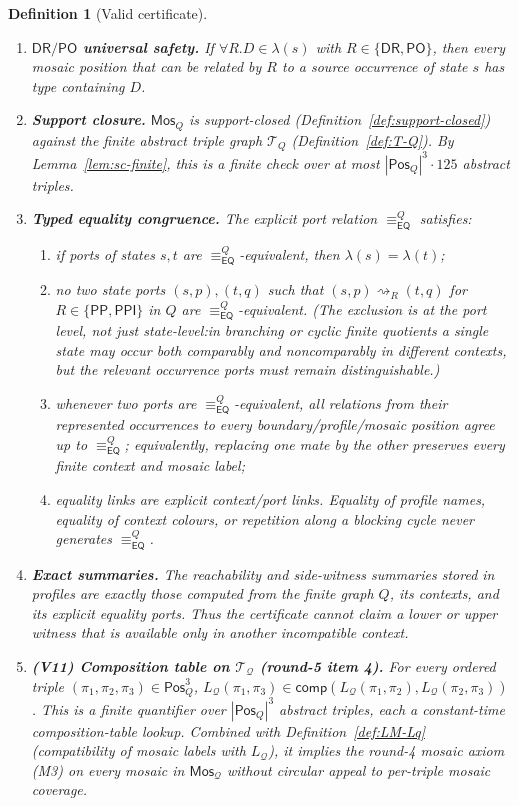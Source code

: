 \documentclass[11pt]{article}
\newtheorem{definition}[theorem]{Definition}
\newcommand{\EQ}{\mathsf{EQ}}
\newcommand{\DR}{\mathsf{DR}}
\newcommand{\PO}{\mathsf{PO}}
\newcommand{\PP}{\mathsf{PP}}
\newcommand{\PPI}{\mathsf{PPI}}
\newcommand{\comp}{\mathsf{comp}}
\newcommand{\Q}{\mathcal Q}
\newcommand{\Mos}{\mathsf{Mos}}
\newcommand{\reach}{\rightsquigarrow}
\newcommand{\eqc}{\equiv_{\EQ}}
\newcommand{\Pos}{\mathsf{Pos}}
\newcommand{\T}{\mathcal T}
\begin{document}
\begin{definition}[Valid certificate]
\begin{enumerate}[label=(V\arabic*)]
\item \textbf{$\DR/\PO$ universal safety.}  If $\forall R.D\in\lambda(s)$ with $R\in\{\DR,\PO\}$, then every mosaic position that can be related by $R$ to a source occurrence of state $s$ has type containing $D$.

\item \textbf{Support closure.}  $\Mos_Q$ is support-closed (Definition~\ref{def:support-closed}) against the finite abstract triple graph $\mathcal T_Q$ (Definition~\ref{def:T-Q}).  By Lemma~\ref{lem:sc-finite}, this is a finite check over at most $|\Pos_Q|^3\cdot 125$ abstract triples.

\item \textbf{Typed equality congruence.}  The explicit port relation $\eqc^{Q}$ satisfies:
  \begin{enumerate}[label=(E\alph*)]
  \item if ports of states $s,t$ are $\eqc^{Q}$-equivalent, then $\lambda(s)=\lambda(t)$;
  \item no two state ports $(s,p),(t,q)$ such that $(s,p)\reach_R(t,q)$ for $R\in\{\PP,\PPI\}$ in $Q$ are $\eqc^{Q}$-equivalent.  (The exclusion is at the port level, not just state-level:\@ in branching or cyclic finite quotients a single state may occur both comparably and noncomparably in different contexts, but the relevant occurrence ports must remain distinguishable.)
  \item whenever two ports are $\eqc^{Q}$-equivalent, all relations from their represented occurrences to every boundary/profile/mosaic position agree up to $\eqc^{Q}$; equivalently, replacing one mate by the other preserves every finite context and mosaic label;
  \item equality links are explicit context/port links.  Equality of profile names, equality of context colours, or repetition along a blocking cycle never generates $\eqc^{Q}$.
  \end{enumerate}

\item \textbf{Exact summaries.}  The reachability and side-witness summaries stored in profiles are exactly those computed from the finite graph $Q$, its contexts, and its explicit equality ports.  Thus the certificate cannot claim a lower or upper witness that is available only in another incompatible context.

\item \textbf{(V11) Composition table on $\T_\Q$ (round-5 item 4).}
  For every ordered triple $(\pi_1,\pi_2,\pi_3)\in\Pos_Q^3$,
  $L_\Q(\pi_1,\pi_3)\in\comp(L_\Q(\pi_1,\pi_2),L_\Q(\pi_2,\pi_3))$.
  This is a finite quantifier over $|\Pos_Q|^3$ abstract triples,
  each a constant-time composition-table lookup.  Combined with
  Definition~\ref{def:LM-Lq} (compatibility of mosaic labels with
  $L_\Q$), it implies the round-4 mosaic axiom (M3) on every mosaic
  in $\Mos_\Q$ without circular appeal to per-triple mosaic
  coverage.


\end{enumerate}
\end{definition}
\end{document}
